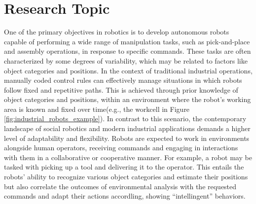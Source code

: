 \section{Research Topic}
\label{sec:research_topic}
One of the primary objectives in robotics is to develop autonomous robots capable of performing a wide range of manipulation tasks, such as pick-and-place and assembly operations, in response to specific commands. These tasks are often characterized by some degrees of variability, which may be related to factors like object categories and positions.
\newline In the context of traditional industrial operations, manually coded control rules can effectively manage situations in which robots follow fixed and repetitive paths. This is achieved through prior knowledge of object categories and positions, within an environment where the robot's working area is known and fixed over time(e.g., the workcell in Figure \ref{fig:industrial_robots_example}).
In contrast to this scenario, the contemporary landscape of social robotics and modern industrial applications demands a higher level of adaptability and flexibility. Robots are expected to work in environments alongside human operators, receiving commands and engaging in interactions with them in a collaborative or cooperative manner. For example, a robot may be tasked with picking up a tool and delivering it to the operator. This entails the robots' ability to recognize various object categories and estimate their positions but also correlate the outcomes of environmental analysis with the requested commands and adapt their actions accordling, showing ``intellingent'' behaviors.

